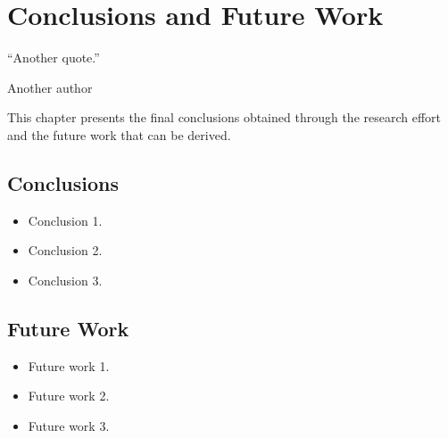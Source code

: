 \chapter{Conclusions and Future Work}
\epigraph{``Another quote.''}{\vspace{10pt}Another author}
\label{chapter:conclusions-fw}

\newpage

This chapter presents the final conclusions obtained through the research effort and the future work that can be derived. 

\section{Conclusions}

\begin{itemize}
	
	\item  Conclusion 1.
	
	\item Conclusion 2.
	
	\item Conclusion 3.
	
	
\end{itemize}


\section{Future Work}

\begin{itemize}
	\item Future work 1.
	
	\item Future work 2.
	
	\item Future work 3.
	
\end{itemize}
